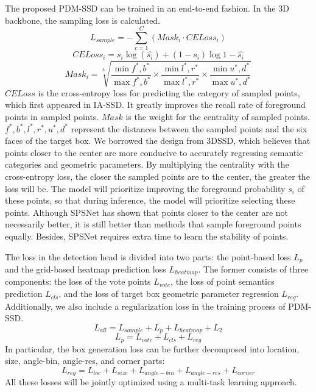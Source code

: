 The proposed PDM-SSD can be trained in an end-to-end fashion. In the 3D backbone, the sampling loss is calculated.
\begin{equation}
	L_{sample}=-\sum_{c=1}^C{(Mask_i \cdot CELoss_i)}
\end{equation}
\begin{equation}
	CELoss_i = s_i \log(\hat{s_i}) + (1-s_i)\log{1-\hat{s_i}}
\end{equation}
\begin{equation}
	Mask_i=\sqrt[3]{\frac{\min{f^*,b^*}}{\max{f^*,b^*}}\times \frac{\min{l^*,r^*}}{\max{l^*,r^*}} \times \frac{\min{u^*,d^*}}{\max{u^*,d^*}}}
\end{equation}
$CELoss$ is the cross-entropy loss for predicting the category of sampled points, which first appeared in IA-SSD. It greatly improves the recall rate of foreground points in sampled points. $Mask$ is the weight for the centrality of sampled points. $f^*,b^*,l^*,r^*,u^*,d^*$ represent the distances between the sampled points and the six faces of the target box. We borrowed the design from 3DSSD, which believes that points closer to the center are more conducive to accurately regressing semantic categories and geometric parameters. By multiplying the centrality with the cross-entropy loss, the closer the sampled points are to the center, the greater the loss will be. The model will prioritize improving the foreground probability $s_i$ of these points, so that during inference, the model will prioritize selecting these points. Although SPSNet has shown that points closer to the center are not necessarily better, it is still better than methods that sample foreground points equally. Besides, SPSNet requires extra time to learn the stability of points.

The loss in the detection head is divided into two parts: the point-based loss $L_{p}$ and the grid-based heatmap prediction loss $L_{heatmap}$. The former consists of three components: the loss of the vote points $L_{vote}$, the loss of point semantics prediction $L_{cls}$, and the loss of target box geometric parameter regression $L_{reg}$. Additionally, we also include a regularization loss in the training process of PDM-SSD.
\begin{equation}
	L_{all}=L_{sample}+L_{p}+L_{heatmap}+L_2
\end{equation}
\begin{equation}
	L_{p}=L_{vote}+L_{cls}+L_{reg}
\end{equation}
In particular, the box generation loss can be further decomposed into location, size, angle-bin, angle-res, and corner parts:
\begin{equation}
	L_{reg}=L_{loc}+L_{size}+L_{angle-bin} + L_{angle-res} + L_{corner}
\end{equation}
All these losses will be jointly optimized using a multi-task learning approach.